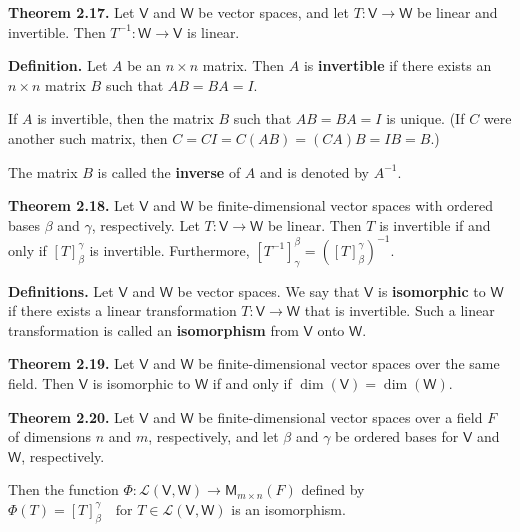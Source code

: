 \documentclass{article}
\newcommand{\0}{\mathit{0}}
\begin{document}
\medskip

\textbf{Theorem 2.17.} Let $\mathsf{V}$ and $\mathsf{W}$ be vector spaces, and let
$T: \mathsf{V} \to \mathsf{W}$ be linear and invertible.
Then $T^{-1}: \mathsf{W} \to \mathsf{V}$ is linear.

\medskip

\textbf{Definition.}
Let $A$ be an $n \times n$ matrix. Then $A$ is \textbf{invertible} if there exists an
$n \times n$ matrix $B$ such that $AB = BA = I$.

If $A$ is invertible, then the matrix $B$ such that $AB = BA = I$ is unique.
(If $C$ were another such matrix, then
$C = CI = C(AB) = (CA)B = IB = B$.)

The matrix $B$ is called the \textbf{inverse} of $A$ and is denoted by $A^{-1}$.

\medskip

\textbf{Theorem 2.18.} Let $\mathsf{V}$ and $\mathsf{W}$ be finite-dimensional vector spaces
with ordered bases $\beta$ and $\gamma$, respectively. Let
$T: \mathsf{V} \to \mathsf{W}$ be linear.
Then $T$ is invertible if and only if $\left[ T \right]^\gamma_\beta$ is invertible.
Furthermore,
\(
\left[ T^{-1} \right]^\beta_\gamma = \left( \left[ T \right]^\gamma_\beta \right)^{-1}.
\)

\medskip

\textbf{Definitions.} Let $\mathsf{V}$ and $\mathsf{W}$ be vector spaces.
We say that $\mathsf{V}$ is \textbf{isomorphic} to $\mathsf{W}$ if there exists a linear transformation
$T: \mathsf{V} \to \mathsf{W}$ that is invertible. Such a linear transformation is called an
\textbf{isomorphism} from $\mathsf{V}$ onto $\mathsf{W}$.

\medskip

\textbf{Theorem 2.19.} Let $\mathsf{V}$ and $\mathsf{W}$ be finite-dimensional vector spaces
over the same field. Then $\mathsf{V}$ is isomorphic to $\mathsf{W}$ if and only if
\(
\dim(\mathsf{V}) = \dim(\mathsf{W}).
\)

\medskip

\textbf{Theorem 2.20.} Let $\mathsf{V}$ and $\mathsf{W}$ be finite-dimensional vector spaces
over a field $F$ of dimensions $n$ and $m$, respectively, and let $\beta$ and $\gamma$
be ordered bases for $\mathsf{V}$ and $\mathsf{W}$, respectively.

Then the function
\(
\Phi: \mathcal{L}(\mathsf{V}, \mathsf{W}) \to \mathsf{M}_{m \times n}(F)
\)
defined by
\(
\Phi(T) = \left[ T \right]^\gamma_\beta \quad \text{for } T \in \mathcal{L}(\mathsf{V}, \mathsf{W})
\)
is an isomorphism.
\end{document}

